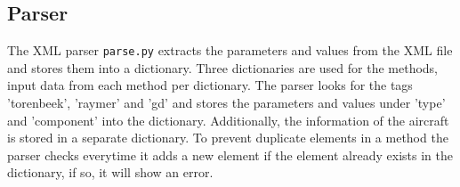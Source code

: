 \subsection{Parser}
\label{sec:parser}
The XML parser \texttt{parse.py} extracts the parameters and values from the XML file and stores them into a dictionary.
Three dictionaries are used for the methods, input data from each method per dictionary.
The parser looks for the tags 'torenbeek', 'raymer' and 'gd' and stores the parameters and values under 'type' and 'component' into the dictionary.
Additionally, the information of the aircraft is stored in a separate dictionary.
To prevent duplicate elements in a method the parser checks everytime it adds a new element if the element already exists in the dictionary, if so, it will show an error.
